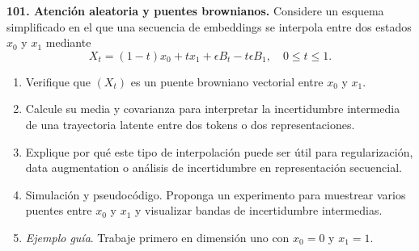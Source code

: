 \documentclass[11pt, letterpaper]{article}
\begin{document}
\newpage
\begin{ejercicio}
    \textbf{101. Atención aleatoria y puentes brownianos.} Considere un esquema simplificado en el que una secuencia de embeddings se interpola entre dos estados $x_{0}$ y $x_{1}$ mediante
    \[ X_{t}=(1-t)x_{0}+tx_{1}+\epsilon B_{t}-t\epsilon B_{1}, \quad 0\le t\le1. \]
    \begin{enumerate}
        \item Verifique que $(X_{t})$ es un puente browniano vectorial entre $x_{0}$ y $x_{1}$.
        \item Calcule su media y covarianza para interpretar la incertidumbre intermedia de una trayectoria latente entre dos tokens o dos representaciones.
        \item Explique por qué este tipo de interpolación puede ser útil para regularización, data augmentation o análisis de incertidumbre en representación secuencial.
        \item Simulación y pseudocódigo. Proponga un experimento para muestrear varios puentes entre $x_{0}$ y $x_{1}$ y visualizar bandas de incertidumbre intermedias.
        \item \textit{Ejemplo guía}. Trabaje primero en dimensión uno con $x_{0}=0$ y $x_{1}=1$.
    \end{enumerate}
\end{ejercicio}

\vspace{5mm}
\end{document}

